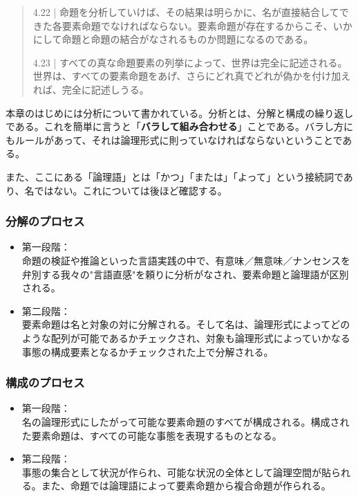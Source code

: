 \documentclass[a4paper,onecolumn,article]{jarticle}
\newcounter{ct}               %
\begin{document}
\begin{quote}

4.22 | 命題を分析していけば、その結果は明らかに、名が直接結合してできた各要素命題でなければならない。要素命題が存在するからこそ、いかにして命題と命題の結合がなされるものか問題になるのである。

4.23 | すべての真な命題要素の列挙によって、世界は完全に記述される。世界は、すべての要素命題をあげ、さらにどれ真でどれが偽かを付け加えれば、完全に記述しうる。


\end{quote}

本章のはじめには分析について書かれている。分析とは、分解と構成の繰り返しである。これを簡単に言うと「{\bf{バラして組み合わせる}}」ことである。バラし方にもルールがあって、それは論理形式に則っていなければならないということである。

また、ここにある「論理語」とは「かつ」「または」「よって」という接続詞であり、名ではない。これについては後ほど確認する。


\subsubsection{分解のプロセス}

\begin{itemize}

\item 第一段階：\\命題の検証や推論といった言語実践の中で、有意味／無意味／ナンセンスを弁別する我々の"言語直感"を頼りに分析がなされ、要素命題と論理語が区別される。

\item 第二段階：\\要素命題は名と対象の対に分解される。そして名は、論理形式によってどのような配列が可能であるかチェックされ、対象も論理形式によっていかなる事態の構成要素となるかチェックされた上で分解される。

\end{itemize}



\subsubsection{構成のプロセス}

\begin{itemize}
\item 第一段階：\\ 名の論理形式にしたがって可能な要素命題のすべてが構成される。構成された要素命題は、すべての可能な事態を表現するものとなる。
\item 第二段階：\\ 事態の集合として状況が作られ、可能な状況の全体として論理空間が貼られる。また、命題では論理語によって要素命題から複合命題が作られる。

\end{itemize}
\end{document}

